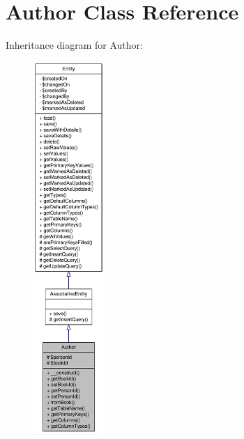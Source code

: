 \hypertarget{classAuthor}{
\section{Author Class Reference}
\label{classAuthor}
}


Inheritance diagram for Author:\nopagebreak
\begin{figure}[H]
\begin{center}
\leavevmode
\includegraphics[height=400pt]{classAuthor__inherit__graph}
\end{center}
\end{figure}


